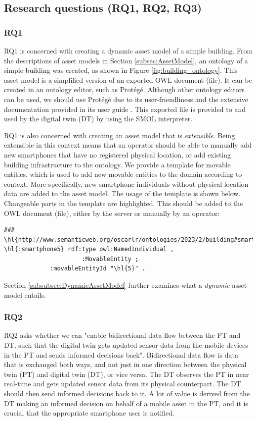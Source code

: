 \documentclass{article}
\begin{document}
\subsection{Research questions (RQ1, RQ2, RQ3)}
\subsubsection{RQ1}\label{subsubsec:RQ1}
RQ1 is concerned with creating a dynamic asset model of a simple building. From the descriptions of asset models in Section \ref{subsec:AssetModel}, an ontology of a simple building was created, as shown in Figure \ref{fig:building_ontology}. This asset model is a simplified version of an exported OWL document (file). It can be created in an ontology editor, such as Protégé. Although other ontology editors can be used, we should use Protégé due to its user-friendliness and the extensive documentation provided in its user guide \cite{horridge_practical_2011}. This exported file is provided to and used by the digital twin (DT) by using the SMOL interpreter.

RQ1 is also concerned with creating an asset model that is \emph{extensible}. Being extensible in this context means that an operator should be able to manually add new smartphones that have no registered physical location, or add existing building infrastructure to the ontology. We provide a template for movable entities, which is used to add new movable entities to the domain according to context. More specifically, new smartphone individuals without physical location data are added to the asset model. The usage of the template is shown below. Changeable parts in the template are highlighted. This should be added to the OWL document (file), either by the server or manually by an operator:

\begin{Verbatim}[commandchars=\\\{\}, breakanywhere=true]
### \hl{http://www.semanticweb.org/oscarlr/ontologies/2023/2/building#smartphone5}
\hl{:smartphone5} rdf:type owl:NamedIndividual ,
                      :MovableEntity ;
             :movableEntityId "\hl{5}" .
\end{Verbatim}  

Section \ref{subsubsec:DynamicAssetModel} further examines what a \emph{dynamic} asset model entails.

\subsubsection{RQ2}\label{subsubsec:RQ2}
RQ2 asks whether we can "enable bidirectional data flow between the PT and DT, such that the digital twin gets updated sensor data from the mobile devices in the PT and sends informed decisions back". Bidirectional data flow is data that is exchanged both ways, and not just in one direction between the physical twin (PT) and digital twin (DT), or vice versa. The DT observes the PT in near real-time and gets updated sensor data from its physical counterpart. The DT should then send informed decisions back to it. A lot of value is derived from the DT making an informed decision on behalf of a mobile asset in the PT, and it is crucial that the appropriate smartphone user is notified.
\end{document}
